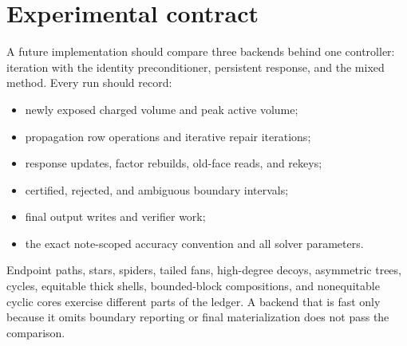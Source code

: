 \section{Experimental contract}
\label{sec:experiments}

A future implementation should compare three backends behind one controller:
iteration with the identity preconditioner, persistent response, and the mixed
method.
Every run should record:

\begin{itemize}
\item newly exposed charged volume and peak active volume;
\item propagation row operations and iterative repair iterations;
\item response updates, factor rebuilds, old-face reads, and rekeys;
\item certified, rejected, and ambiguous boundary intervals;
\item final output writes and verifier work;
\item the exact note-scoped accuracy convention and all solver parameters.
\end{itemize}

Endpoint paths, stars, spiders, tailed fans, high-degree decoys, asymmetric
trees, cycles, equitable thick shells, bounded-block compositions, and
nonequitable cyclic cores exercise different parts of the ledger.  A backend
that is fast only because it omits boundary reporting or final materialization
does not pass the comparison.
